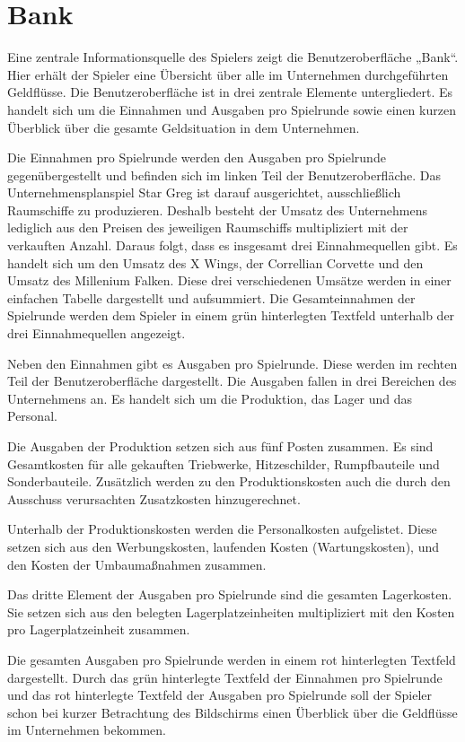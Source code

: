 \section{Bank}
\label{sec:ui-bank}

Eine zentrale Informationsquelle des Spielers zeigt die Benutzeroberfläche „Bank“. Hier erhält der Spieler eine Übersicht über alle im Unternehmen durchgeführten Geldflüsse. Die Benutzeroberfläche ist in drei zentrale Elemente untergliedert. Es handelt sich um die Einnahmen und Ausgaben pro Spielrunde sowie einen kurzen Überblick über die gesamte Geldsituation in dem Unternehmen.
 
Die Einnahmen pro Spielrunde werden den Ausgaben pro Spielrunde gegenübergestellt und befinden sich im linken Teil der Benutzeroberfläche. Das Unternehmensplanspiel Star Greg ist darauf ausgerichtet, ausschließlich Raumschiffe zu produzieren. Deshalb besteht der Umsatz des Unternehmens lediglich aus den Preisen des jeweiligen Raumschiffs multipliziert mit der verkauften Anzahl. Daraus folgt, dass es insgesamt drei Einnahmequellen gibt. Es handelt sich um den Umsatz des X Wings, der Correllian Corvette und den Umsatz des Millenium Falken. Diese drei verschiedenen Umsätze werden in einer einfachen Tabelle dargestellt und aufsummiert. Die Gesamteinnahmen der Spielrunde werden dem Spieler in einem grün hinterlegten Textfeld unterhalb der drei Einnahmequellen angezeigt.
 
Neben den Einnahmen gibt es Ausgaben pro Spielrunde. Diese werden im rechten Teil der Benutzeroberfläche dargestellt. Die Ausgaben fallen in drei Bereichen des Unternehmens an. Es handelt sich um die Produktion, das Lager und das Personal.
 
Die Ausgaben der Produktion setzen sich aus fünf Posten zusammen. Es sind Gesamtkosten für alle gekauften Triebwerke, Hitzeschilder, Rumpfbauteile und Sonderbauteile. Zusätzlich werden zu den Produktionskosten auch die durch den Ausschuss verursachten  Zusatzkosten hinzugerechnet.
 
Unterhalb der Produktionskosten werden die Personalkosten aufgelistet. Diese setzen sich aus den Werbungskosten, laufenden Kosten (Wartungskosten), und den Kosten der Umbaumaßnahmen zusammen.
 
Das dritte Element der Ausgaben pro Spielrunde sind die gesamten Lagerkosten. Sie setzen sich aus den belegten Lagerplatzeinheiten multipliziert mit den Kosten pro Lagerplatzeinheit zusammen.
 
Die gesamten Ausgaben pro Spielrunde werden in einem rot hinterlegten Textfeld dargestellt. Durch das grün hinterlegte Textfeld der Einnahmen pro Spielrunde und das rot hinterlegte Textfeld der Ausgaben pro Spielrunde soll der Spieler schon bei kurzer Betrachtung des Bildschirms einen Überblick über die Geldflüsse im Unternehmen bekommen.
  
